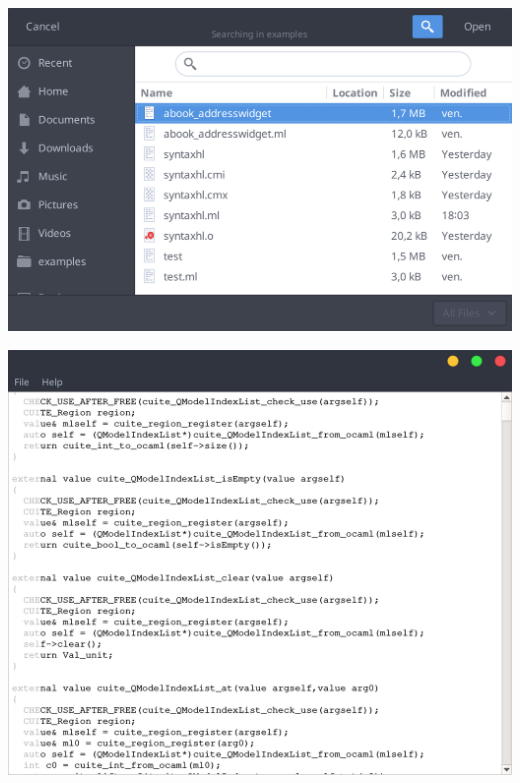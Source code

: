 \begin{frame}
  \includegraphics[width=\textwidth]{address_dialog}
\end{frame}

\begin{frame}
  \includegraphics[width=\textwidth]{syntaxhl}
\end{frame}

